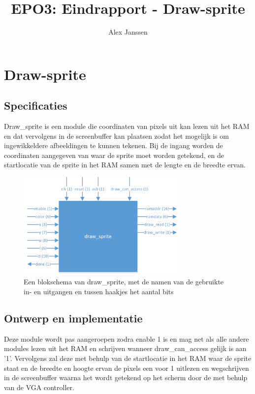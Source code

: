\documentclass{scrartcl} %
\author{Alex Janssen}
\title{EPO3: Eindrapport - Draw-sprite}
\begin{document}
\section{Draw-sprite}
\label{sec:draw-sprite}

\subsection{Specificaties}
Draw\_sprite is een module die coordinaten van pixels uit kan lezen uit het RAM en dat vervolgens in de screenbuffer kan plaatsen zodat het mogelijk is om ingewikkeldere afbeeldingen te kunnen tekenen. Bij de ingang worden de coordinaten aangegeven van waar de sprite moet worden getekend, en de startlocatie van de sprite in het RAM samen met de lengte en de breedte ervan.

\begin{figure}[H]
	\centering
	\includegraphics[width=0.75\textwidth]{resource/draw_sprite.png}
	\caption{Een blokschema van draw\_sprite, met de namen van de gebruikte in- en uitgangen en tussen haakjes het aantal bits}
	\label{fig:draw-sprite-schema}
\end{figure}

\subsection{Ontwerp en implementatie}
Deze module wordt pas aangeroepen zodra enable 1 is en mag net als alle andere modules lezen uit het RAM en schrijven wanneer draw\_can\_access gelijk is aan '1'. Vervolgens zal deze met behulp van de startlocatie in het RAM waar de sprite staat en de breedte en hoogte ervan de pixels een voor 1 uitlezen en wegschrijven in de screenbuffer waarna het wordt getekend op het scherm door de met behulp van de VGA controller.

\end{document}
